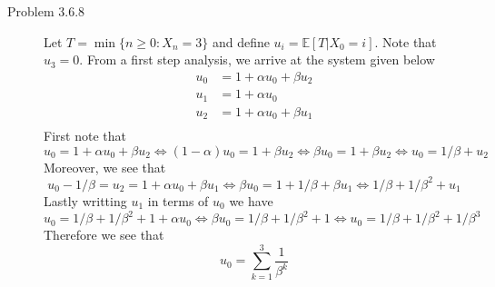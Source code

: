 \documentclass[12pt]{article}  %
\newcommand{\E}{{\mathbb{E}}}
\begin{document}
\begin{description}
\item[Problem 3.6.8]
Let $T  =\min\{n\geq 0: X_n = 3\}$ and define $u_i = \E[T|X_0 = i]$. Note that $u_3 = 0$. From a first step analysis, we arrive at the system given below 
\begin{align*}
u_0 &= 1 + \alpha u_0 + \beta u_2\\
u_1 &= 1 + \alpha u_0 \\
u_2 &= 1 + \alpha u_0 + \beta u_1\\
\end{align*}
First note that $$u_0 = 1 + \alpha u_0 + \beta u_2 \iff (1-\alpha)u_0= 1 + \beta u_2 \iff \beta u_0 = 1 + \beta u_2 \iff u_0 = 1/\beta + u_2$$ Moreover, we see that $$u_0 - 1/\beta = u_2 = 1 + \alpha u_0 + \beta u_1 \iff \beta u_0 = 1 + 1/\beta + \beta u_1\iff 1/\beta + 1/\beta^2 + u_1$$
Lastly writting $u_1$ in terms of $u_0$ we have $$u_0 = 1/\beta + 1/\beta^2 + 1 + \alpha u_0 \iff \beta u_0 = 1/\beta + 1/\beta^2 + 1 \iff u_0 = 1/\beta + 1/\beta^2+ 1/\beta^3$$
Therefore we see that $$u_0 = \sum_{k = 1}^3\frac{1}{\beta^k }$$


\end{description}
\end{document}
